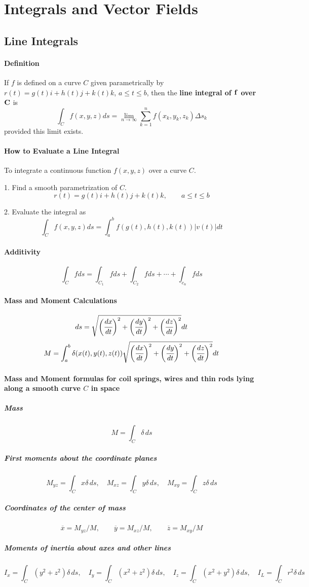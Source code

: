 \documentclass{article}
\begin{document}
    \newpage
    \section{Integrals and Vector Fields}
        \subsection{Line Integrals}
            \paragraph{Definition} If $f$ is defined on a curve $C$ given parametrically by $r(t)=g(t)i+h(t)j+k(t)k$, $a\le t\le b$, then the \textbf{line integral of $\bf{f}$ over $\bf{C}$} is
            \[\int_C f(x,y,z)ds=\lim\limits_{n\to\infty}\sum_{k=1}^nf(x_k,y_k,z_k)\Delta s_k\]
            provided this limit exists.
            \paragraph{How to Evaluate a Line Integral} To integrate a continuous function $f(x,y,z)$ over a curve $C$.
            \par 1. Find a smooth parametrization of $C$.
            \[r(t)=g(t)i+h(t)j+k(t)k,\qquad a\le t\le b\]
            \par 2. Evaluate the integral as
            \[\int_Cf(x,y,z)ds=\int_a^bf(g(t),h(t),k(t))|v(t)|dt\]
            \paragraph{Additivity}
                \[\int_Cfds=\int_{C_1}fds+\int_{C_2}fds+\cdots+\int_{c_n}fds\]
            \paragraph{Mass and Moment Calculations}
                \[ds=\sqrt{\bigg(\cfrac{dx}{dt}\bigg)^2+\bigg(\cfrac{dy}{dt}\bigg)^2+\bigg(\cfrac{dz}{dt}\bigg)^2}dt\]
                \[M=\int_a^b\delta(x(t),y(t),z(t))\sqrt{\bigg(\cfrac{dx}{dt}\bigg)^2+\bigg(\cfrac{dy}{dt}\bigg)^2+\bigg(\cfrac{dz}{dt}\bigg)^2}dt\]
            \paragraph{Mass and Moment formulas for coil springs, wires and thin rods lying along a smooth curve $C$ in space}
                \subparagraph{Mass}
                \[M=\int_C\delta\,ds\]
                \subparagraph{First moments about the coordinate planes}
                \[M_{yz}=\int_Cx\delta\,ds,\quad M_{xz}=\int_Cy\delta\,ds,\quad M_{xy}=\int_Cz\delta\,ds\]
                \subparagraph{Coordinates of the center of mass}
                \[\overline{x}=M_{yz}/M,\qquad \overline{y}=M_{xz}/M,\qquad \overline{z}=M_{xy}/M\]
                \subparagraph{Moments of inertia about axes and other lines}
                \[I_x=\int_C(y^2+z^2)\delta\,ds,\quad I_y=\int_C(x^2+z^2)\delta\,ds,\quad I_z=\int_C(x^2+y^2)\delta\,ds,\quad I_L=\int_Cr^2\delta\, ds\]
\end{document}
